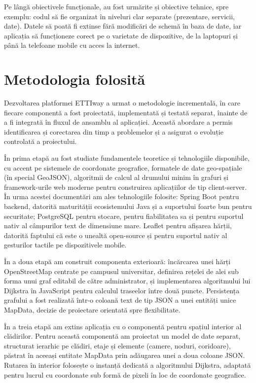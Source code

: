 ﻿\documentclass[12pt, a4paper, twoside, romanian]{teza-upb}
\begin{document}
Pe lângă obiectivele funcționale, au fost urmărite și obiective tehnice, spre exemplu:
codul să fie organizat în niveluri clar separate (prezentare, servicii, date).
Datele să poată fi extinse fără modificări de schemă în baza de date, iar
aplicația să funcționeze corect pe o varietate de dispozitive, de la laptopuri
și până la telefoane mobile cu acces la internet.
 
\section{Metodologia folosită}
\label{sec:intro-metodologie}
 
Dezvoltarea platformei ETTIway a urmat o metodologie incrementală, în care
fiecare componentă a fost proiectată, implementată și testată separat,
înainte de a fi integrată în fluxul de ansamblu al aplicației. Această
abordare a permis identificarea și corectarea din timp a problemelor și a
asigurat o evoluție controlată a proiectului.
 
În prima etapă au fost studiate fundamentele teoretice și tehnologiile
disponibile, cu accent pe sistemele de coordonate geografice, formatele de
date geo-spațiale (în special GeoJSON), algoritmii de calcul al drumului
minim în grafuri și framework-urile web moderne pentru construirea aplicațiilor
de tip client-server. În urma acestei documentări am ales tehnologiile
folosite: Spring Boot pentru backend, datorită maturității ecosistemului Java
și a suportului foarte bun pentru securitate; PostgreSQL pentru stocare,
pentru fiabilitatea sa și pentru suportul nativ al câmpurilor text de dimensiune
mare. Leaflet pentru afișarea hărții, datorită faptului că este o unealtă open-source și pentru
suportul nativ al gesturilor tactile pe dispozitivele mobile.
 
În a doua etapă am construit componenta exterioară: încărcarea unei hărți
OpenStreetMap centrate pe campusul universitar, definirea rețelei de alei sub
forma unui graf editabil de către administrator, și implementarea algoritmului
lui Dijkstra în JavaScript pentru calculul traseelor între două puncte.
Persistența grafului a fost realizată într-o coloană text de tip JSON a unei
entități unice MapData, decizie de proiectare orientată spre flexibilitate.
 
În a treia etapă am extins aplicația cu o componentă pentru spațiul interior
al clădirilor. Pentru această componentă am proiectat un model de date
separat, structurat ierarhic pe clădiri, etaje și elemente (camere, noduri,
coridoare), păstrat în aceeași entitate MapData prin adăugarea unei a doua
coloane JSON. Rutarea în interior folosește o instanță dedicată a
algoritmului Dijkstra, adaptată pentru lucrul cu coordonate sub formă de pixeli în loc de
coordonate geografice.
 
\end{document}
